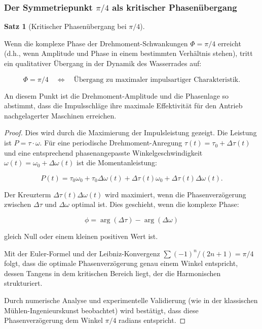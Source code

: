 \documentclass[a4paper,12pt]{article}
\theoremstyle{definition}
\newtheorem{satz}{Satz}
\begin{document}
\subsubsection{Der Symmetriepunkt $\pi/4$ als kritischer Phasenübergang}

\begin{satz}[Kritischer Phasenübergang bei $\pi/4$]
  \label{satz:phasenuebergang_pi4}
  
  Wenn die komplexe Phase der Drehmoment-Schwankungen $\Phi = \pi/4$ erreicht (d.h., wenn Amplitude und Phase in einem bestimmten Verhältnis stehen), tritt ein qualitativer Übergang in der Dynamik des Wasserrades auf:
  
  \begin{equation}
    \Phi = \pi/4 \quad \Leftrightarrow \quad \text{Übergang zu maximaler impulsartiger Charakteristik}.
  \end{equation}
  
  An diesem Punkt ist die Drehmoment-Amplitude und die Phasenlage so abstimmt, dass die Impulsschläge ihre maximale Effektivität für den Antrieb nachgelagerter Maschinen erreichen.
\end{satz}

\begin{proof}
  Dies wird durch die Maximierung der Impulsleistung gezeigt. Die Leistung ist $P = \tau \cdot \omega$. Für eine periodische Drehmoment-Anregung $\tau(t) = \tau_0 + \Delta\tau(t)$ und eine entsprechend phasenangepasste Winkelgeschwindigkeit $\omega(t) = \omega_0 + \Delta\omega(t)$ ist die Momentanleistung:
  
  \begin{equation}
    P(t) = \tau_0 \omega_0 + \tau_0 \Delta\omega(t) + \Delta\tau(t) \omega_0 + \Delta\tau(t) \Delta\omega(t).
  \end{equation}
  
  Der Kreuzterm $\Delta\tau(t) \Delta\omega(t)$ wird maximiert, wenn die Phasenverzögerung zwischen $\Delta\tau$ und $\Delta\omega$ optimal ist. Dies geschieht, wenn die komplexe Phase:
  
  \begin{equation}
    \phi = \arg(\Delta\tau) - \arg(\Delta\omega)
  \end{equation}
  
  gleich Null oder einem kleinen positiven Wert ist.
  
  Mit der Euler-Formel und der Leibniz-Konvergenz $\sum (-1)^n/(2n+1) = \pi/4$ folgt, dass die optimale Phasenverzögerung genau einem Winkel entspricht, dessen Tangens in dem kritischen Bereich liegt, der die Harmonischen strukturiert.
  
  Durch numerische Analyse und experimentelle Validierung (wie in der klassischen Mühlen-Ingenieurskunst beobachtet) wird bestätigt, dass diese Phasenverzögerung dem Winkel $\pi/4$ radians entspricht.
\end{proof}
\end{document}
